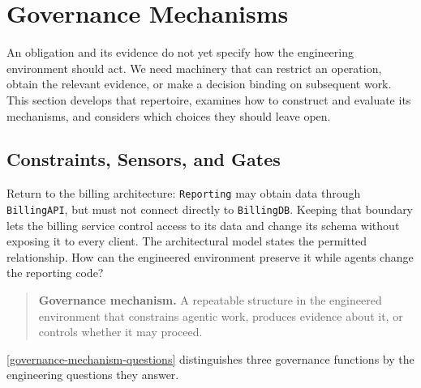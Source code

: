 


\chapter{Governance Mechanisms}

An obligation and its evidence do not yet specify how the engineering environment should act. We need machinery that can restrict an operation, obtain the relevant evidence, or make a decision binding on subsequent work. This section develops that repertoire, examines how to construct and evaluate its mechanisms, and considers which choices they should leave open.

\section{Constraints, Sensors, and Gates}\label{heading:constraints-sensors-and-gates}


Return to the billing architecture: \texttt{Reporting} may obtain data through \texttt{BillingAPI}, but must not connect directly to \texttt{BillingDB}.
Keeping that boundary lets the billing service control access to its data and change its schema without exposing it to every client.
The architectural model states the permitted relationship.
How can the engineered environment preserve it while agents change the reporting code?


\begin{quote}
\textbf{Governance mechanism.} A repeatable structure in the engineered environment that constrains agentic work, produces evidence about it, or controls whether it may proceed.
\end{quote}

\autoref{governance-mechanism-questions} distinguishes three governance functions by the engineering questions they answer.

